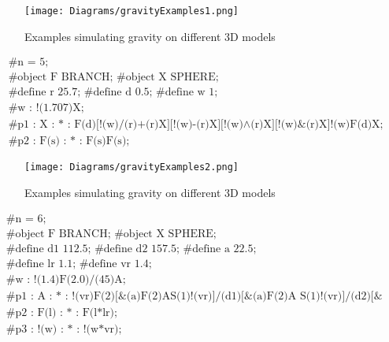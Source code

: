 \begin{figure}[htbp]
	{\centering
		\vspace{7px}
		\texttt{[image: Diagrams/gravityExamples1.png]}
		\label{3DAxisFigure} \label{Gravity applied to generated models}
		\caption{Examples simulating gravity on different 3D models}
	}
\end{figure}
\FloatBarrier

\begin{singlespace}
\begin{equation}
\begin{aligned}
	&\textrm{\#n = 5;} \\
	&\textrm{\#object F BRANCH; \#object X SPHERE;}\\
	&\textrm{\#define r 25.7; \#define d 0.5; \#define w 1;}\\
	&\textrm{\#w : !(1.707)X;}\\
	&\textrm{\#p1 : X : * : F(d)[!(w)/(r)+(r)X][!(w)-(r)X][!(w)$\land$(r)X][!(w)\&(r)X]!(w)F(d)X;}\\
	&\textrm{\#p2 : F(s) : * : F(s)F(s);}
\end{aligned}
\end{equation}
\end{singlespace}

\begin{figure}[htbp]
	{\centering
		\vspace{7px}
		\texttt{[image: Diagrams/gravityExamples2.png]}
		\label{3DAxisFigure} \label{Gravity applied to generated models}
		\caption{Examples simulating gravity on different 3D models}
	}
\end{figure}
\FloatBarrier

\begin{singlespace}
\begin{equation}
\begin{aligned}
	&\textrm{\#n = 6;} \\
	&\textrm{\#object F BRANCH; \#object X SPHERE;}\\
	&\textrm{\#define d1 112.5; \#define d2 157.5; \#define a 22.5;}\\
	&\textrm{\#define lr 1.1; \#define vr 1.4;}\\
	&\textrm{\#w : !(1.4)F(2.0)/(45)A;}\\
	&\textrm{\#p1 : A : * : !(vr)F(2)[\&(a)F(2)AS(1)!(vr)]/(d1)[\&(a)F(2)A S(1)!(vr)]/(d2)[\&(a)F(2)A S(1)!(vr);}\\
	&\textrm{\#p2 : F(l) : * : F(l*lr);}\\
	&\textrm{\#p3 : !(w) : * : !(w*vr);}
\end{aligned}
\end{equation}
\end{singlespace}

